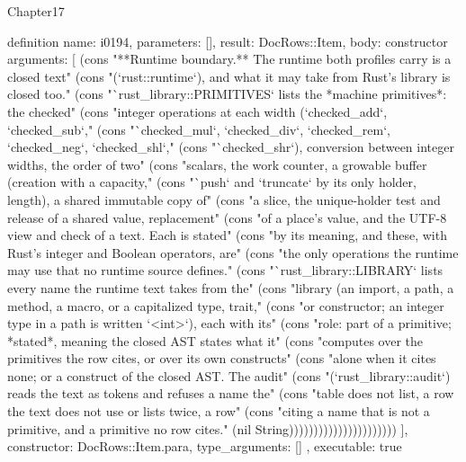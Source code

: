 \begin{lexlean}{Chapter17}
\begin{semanticmodule}
definition{
  name: i0194,
  parameters: [],
  result: DocRows::Item,
  body: constructor{
    arguments: [
      (cons "**Runtime boundary.** The runtime both profiles carry is a closed text" (cons "(`rust::runtime`), and what it may take from Rust's library is closed too." (cons "`rust_library::PRIMITIVES` lists the *machine primitives*: the checked" (cons "integer operations at each width (`checked_add`, `checked_sub`," (cons "`checked_mul`, `checked_div`, `checked_rem`, `checked_neg`, `checked_shl`," (cons "`checked_shr`), conversion between integer widths, the order of two" (cons "scalars, the work counter, a growable buffer (creation with a capacity," (cons "`push` and `truncate` by its only holder, length), a shared immutable copy of" (cons "a slice, the unique-holder test and release of a shared value, replacement" (cons "of a place's value, and the UTF-8 view and check of a text. Each is stated" (cons "by its meaning, and these, with Rust's integer and Boolean operators, are" (cons "the only operations the runtime may use that no runtime source defines." (cons "`rust_library::LIBRARY` lists every name the runtime text takes from the" (cons "library (an import, a path, a method, a macro, or a capitalized type, trait," (cons "or constructor; an integer type in a path is written `<int>`), each with its" (cons "role: part of a primitive; *stated*, meaning the closed AST states what it" (cons "computes over the primitives the row cites, or over its own constructs" (cons "alone when it cites none; or a construct of the closed AST. The audit" (cons "(`rust_library::audit`) reads the text as tokens and refuses a name the" (cons "table does not list, a row the text does not use or lists twice, a row" (cons "citing a name that is not a primitive, and a primitive no row cites." (nil String))))))))))))))))))))))
    ],
    constructor: DocRows::Item.para,
    type_arguments: []
  },
  executable: true
}


\end{semanticmodule}
\end{lexlean}
